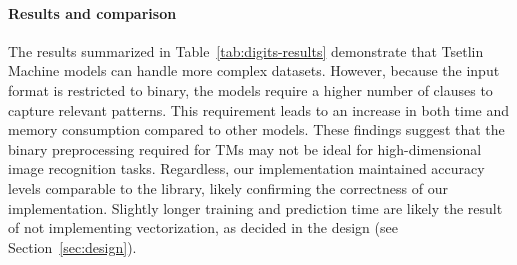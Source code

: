 \paragraph{Results and comparison}
The results summarized in Table~\ref{tab:digits-results} demonstrate that Tsetlin Machine models can handle more complex datasets. However, because the input format is restricted to binary, the models require a higher number of clauses to capture relevant patterns. This requirement leads to an increase in both time and memory consumption compared to other models. These findings suggest that the binary preprocessing required for TMs may not be ideal for high-dimensional image recognition tasks. Regardless, our implementation maintained accuracy levels comparable to the \GreenTsetlinName library, likely confirming the correctness of our implementation. Slightly longer training and prediction time are likely the result of \LibraryName not implementing vectorization, as decided in the design (see Section~\ref{sec:design}).

